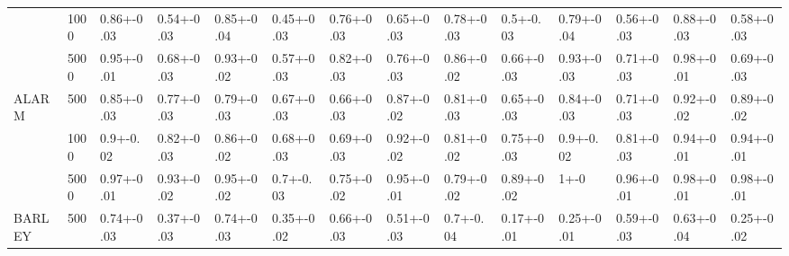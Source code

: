 \begin{landscape}
\begin{center}
{\begin{tabular}{llllllllllllll}
           & 1000    & 0.86+-0.03                    & 0.54+-0.03                 & 0.85+-0.04                    & 0.45+-0.03                 & 0.76+-0.03                    & 0.65+-0.03                 & 0.78+-0.03                    & 0.5+-0.03                  & 0.79+-0.04                    & 0.56+-0.03                 & 0.88+-0.03                    & 0.58+-0.03                 \\
           & 5000    & 0.95+-0.01                    & 0.68+-0.03                 & 0.93+-0.02                    & 0.57+-0.03                 & 0.82+-0.03                    & 0.76+-0.03                 & 0.86+-0.02                    & 0.66+-0.03                 & 0.93+-0.03                    & 0.71+-0.03                 & 0.98+-0.01                    & 0.69+-0.03                 \\ \hline
ALARM      & 500     & 0.85+-0.03                    & 0.77+-0.03                 & 0.79+-0.03                    & 0.67+-0.03                 & 0.66+-0.03                    & 0.87+-0.02                 & 0.81+-0.03                    & 0.65+-0.03                 & 0.84+-0.03                    & 0.71+-0.03                 & 0.92+-0.02                    & 0.89+-0.02                 \\
           & 1000    & 0.9+-0.02                     & 0.82+-0.03                 & 0.86+-0.02                    & 0.68+-0.03                 & 0.69+-0.03                    & 0.92+-0.02                 & 0.81+-0.02                    & 0.75+-0.03                 & 0.9+-0.02                     & 0.81+-0.03                 & 0.94+-0.01                    & 0.94+-0.01                 \\
           & 5000    & 0.97+-0.01                    & 0.93+-0.02                 & 0.95+-0.02                    & 0.7+-0.03                  & 0.75+-0.02                    & 0.95+-0.01                 & 0.79+-0.02                    & 0.89+-0.02                 & 1+-0                          & 0.96+-0.01                 & 0.98+-0.01                    & 0.98+-0.01                 \\ \hline
BARLEY     & 500     & 0.74+-0.03                    & 0.37+-0.03                 & 0.74+-0.03                    & 0.35+-0.02                 & 0.66+-0.03                    & 0.51+-0.03                 & 0.7+-0.04                            & 0.17+-0.01                         & 0.25+-0.01                            & 0.59+-0.03                         & 0.63+-0.04                    & 0.25+-0.02                 \\

\end{tabular}}
\end{center}
\end{landscape}
